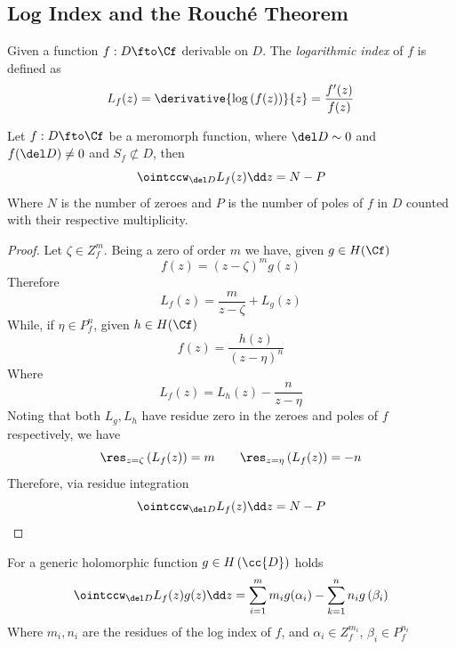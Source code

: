 \documentclass[../mmf.tex]{subfiles}
\begin{document}
\subsection{Log Index and the Rouché Theorem}
\begin{dfn}
	Given a function $f:D\fto\Cf$ derivable on $D$. The \textit{logarithmic index} of $f$ is defined as
	\begin{equation}
		L_{f}(z)=\derivative{\log\left( f(z) \right)}{z}=\frac{f'(z)}{f(z)}
		\label{eq:logindexf}
	\end{equation}
\end{dfn}
\begin{thm}
	Let $f:D\fto\Cf$ be a meromorph function, where $\del D\sim0$ and $f(\del D)\ne 0$ and $S_f\not\subset D$, then
	\begin{equation*}
		\ointccw_{\del D}L_{f}(z)\dd z=N-P
	\end{equation*}
	Where $N$ is the number of zeroes and $P$ is the number of poles of $f$ in $D$ counted with their respective multiplicity.
\end{thm}
\begin{proof}
	Let $\zeta\in Z_f^m$. Being a zero of order $m$ we have, given $g\in H(\Cf)$
	\begin{equation*}
		f(z)=\left( z-\zeta \right)^mg(z)
	\end{equation*}
	Therefore
	\begin{equation*}
		L_{f}(z)=\frac{m}{z-\zeta}+L_{g}(z)
	\end{equation*}
	While, if $\eta\in P_f^n$, given $h\in H(\Cf)$
	\begin{equation*}
		f(z)=\frac{h(z)}{\left( z-\eta \right)^n}
	\end{equation*}
	Where
	\begin{equation*}
		L_{f}(z)=L_{h}(z)-\frac{n}{z-\eta}
	\end{equation*}
	Noting that both $L_g, L_h$ have residue zero in the zeroes and poles of $f$ respectively, we have
	\begin{equation*}
		\res_{z=\zeta}\left(L_{f}(z)\right)=m\qquad\res_{z=\eta}\left(L_{f}(z)\right)=-n
	\end{equation*}
	Therefore, via residue integration
	\begin{equation*}
		\ointccw_{\del D}L_{f}(z)\dd z=N-P
	\end{equation*}
\end{proof}
\begin{cor}
	For a generic holomorphic function $g\in H\left( \cc{D} \right)$ holds
	\begin{equation}
		\ointccw_{\del D}L_{f}(z)g(z)\dd z=\sum_{i=1}^mm_ig(\alpha_i)-\sum_{k=1}^{n}n_ig\left( \beta_i \right)
		\label{eq:genlogindex}
	\end{equation}
	Where $m_i, n_i$ are the residues of the log index of $f$, and $\alpha_i\in Z_f^{m_i}$, $\beta_i\in P^{n_i}_f$
\end{cor}
\end{document}
